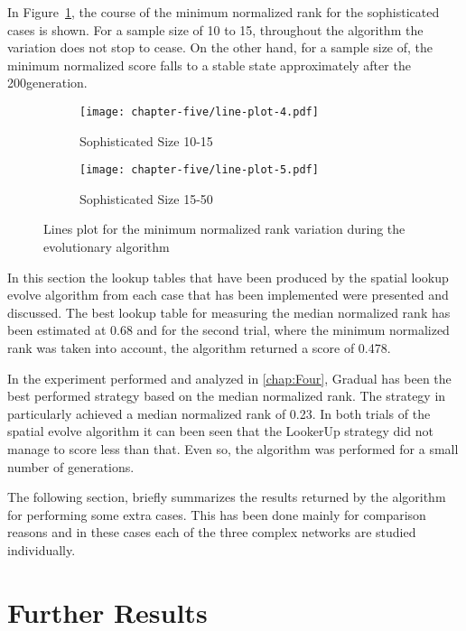 In Figure~\ref{fig:line-plot-min}, the course of the minimum normalized rank
for the sophisticated cases is shown. For a sample size of 10 to 15, throughout
the algorithm the variation does not stop to cease. On the other hand, for a sample
size of, the minimum normalized score falls to a stable state approximately
after the 200\nth generation.

\begin{figure}[H]
	\centering
	\begin{subfigure}[H]{0.45\textwidth}
		\centering
		\texttt{[image: chapter-five/line-plot-4.pdf]}
		\caption{Sophisticated Size 10-15}
	\end{subfigure}
  \hfill
  \begin{subfigure}[H]{0.45\textwidth}
    \centering
    \texttt{[image: chapter-five/line-plot-5.pdf]}
    \caption{Sophisticated Size 15-50}
  \end{subfigure}
	\caption{Lines plot for the minimum normalized rank variation during the
          evolutionary algorithm}
	\label{fig:line-plot-min}
\end{figure}

In this section the lookup tables that have been produced by the spatial lookup
evolve algorithm from each case that has been implemented were presented and discussed.
The best lookup table for measuring the median normalized rank has been estimated
at 0.68 and for the second trial, where the minimum normalized rank was taken into
account, the algorithm returned a score of 0.478.

In the experiment performed and analyzed in \autoref{chap:Four}, Gradual has been
the best performed strategy based on the median normalized rank. The strategy in
particularly achieved a median normalized rank of 0.23. In both trials of the
spatial evolve algorithm it can been seen that the LookerUp strategy did not
manage to score less than that. Even so, the algorithm was performed for a small
number of generations.

The following section, briefly summarizes the results returned by the algorithm
for performing some extra cases. This has been done mainly for comparison reasons
and in these cases each of the three complex networks are studied individually.

\section{Further Results}

